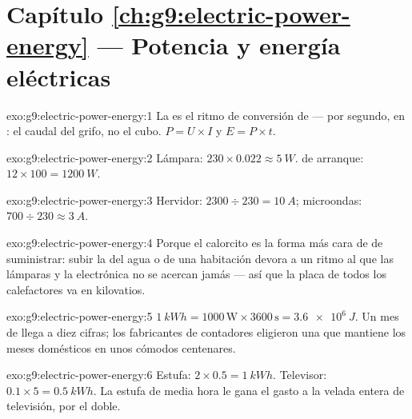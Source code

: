 \section*{Capítulo \ref{ch:g9:electric-power-energy} --- Potencia y energía eléctricas}

\begin{solution}{exo:g9:electric-power-energy:1}
La  es el ritmo de conversión de  ---
 por segundo, en : el caudal del grifo, no el
cubo. $P = U \times I$ y $E = P \times t$.
\end{solution}

\begin{solution}{exo:g9:electric-power-energy:2}
Lámpara: $230 \times 0.022 \approx \qty{5}{W}$.  de arranque: $12
\times 100 = \qty{1200}{W}$.
\end{solution}

\begin{solution}{exo:g9:electric-power-energy:3}
Hervidor: $2300 \div 230 = \qty{10}{A}$; microondas: $700 \div 230
\approx \qty{3}{A}$.
\end{solution}

\begin{solution}{exo:g9:electric-power-energy:4}
Porque el calorcito es la forma más cara de  de
suministrar: subir la  del agua o de una habitación
devora  a un ritmo al que las lámparas y la electrónica no
se acercan jamás --- así que la placa de todos los calefactores va en
kilovatios.
\end{solution}

\begin{solution}{exo:g9:electric-power-energy:5}
$\qty{1}{kWh} = 1000 \, \text{W} \times 3600 \, \text{s} =
\qty{3.6e6}{J}$. Un mes de  llega a diez cifras; los
fabricantes de contadores eligieron una  que mantiene los
meses domésticos en unos cómodos centenares.
\end{solution}

\begin{solution}{exo:g9:electric-power-energy:6}
Estufa: $2 \times 0.5 = \qty{1}{kWh}$. Televisor: $0.1 \times 5 =
\qty{0.5}{kWh}$. La estufa de media hora le gana el gasto a la velada
entera de televisión, por el doble.
\end{solution}

